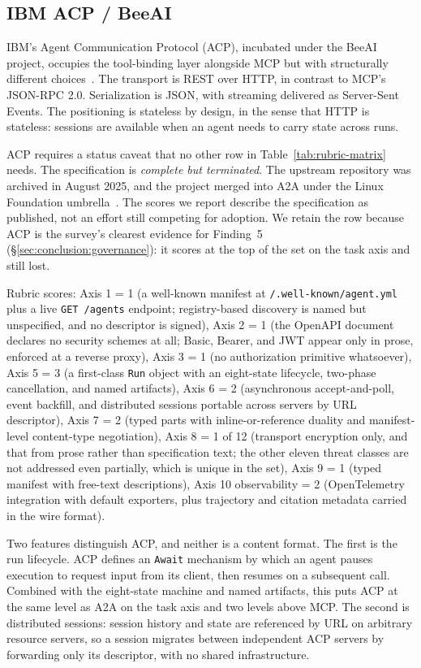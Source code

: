 \subsection{IBM ACP / BeeAI}
\label{sec:industry:acp}

IBM's Agent Communication Protocol (ACP), incubated under
the BeeAI project, occupies the tool-binding layer
alongside MCP but with structurally different
choices~\cite{spec_acp}. The transport is REST over HTTP,
in contrast to MCP's JSON-RPC 2.0. Serialization is JSON,
with streaming delivered as Server-Sent Events. The
positioning is stateless by design, in the sense that HTTP
is stateless: sessions are available when an agent needs
to carry state across runs.

ACP requires a status caveat that no other row in
Table~\ref{tab:rubric-matrix} needs. The specification is
\emph{complete but terminated}. The upstream repository was
archived in August 2025, and the project merged into A2A
under the Linux Foundation umbrella~\cite{spec_acp}. The
scores we report describe the specification as published,
not an effort still competing for adoption. We retain the
row because ACP is the survey's clearest evidence for
Finding~5 (\S\ref{sec:conclusion:governance}): it scores at
the top of the set on the task axis and still lost.

Rubric scores: Axis 1 = 1 (a well-known manifest at
\texttt{/.well-known/agent.yml} plus a live
\texttt{GET /agents} endpoint; registry-based discovery is
named but unspecified, and no descriptor is signed),
Axis 2 = 1 (the OpenAPI document declares no security
schemes at all; Basic, Bearer, and JWT appear only in prose,
enforced at a reverse proxy), Axis 3 = 1 (no authorization
primitive whatsoever), Axis 5 = 3 (a first-class
\texttt{Run} object with an eight-state lifecycle,
two-phase cancellation, and named artifacts), Axis 6 = 2
(asynchronous accept-and-poll, event backfill, and
distributed sessions portable across servers by URL
descriptor), Axis 7 = 2 (typed parts with inline-or-reference
duality and manifest-level content-type negotiation),
Axis 8 = 1 of 12 (transport encryption only, and that from
prose rather than specification text; the other eleven
threat classes are not addressed even partially, which is
unique in the set), Axis 9 = 1 (typed
manifest with free-text descriptions), Axis 10
observability = 2 (OpenTelemetry integration with default
exporters, plus trajectory and citation metadata carried in
the wire format).

Two features distinguish ACP, and neither is a content
format. The first is the run lifecycle. ACP defines an
\texttt{Await} mechanism by which an agent pauses execution
to request input from its client, then resumes on a
subsequent call. Combined with the eight-state machine and
named artifacts, this puts ACP at the same level as A2A on
the task axis and two levels above MCP. The second is
distributed sessions: session history and state are
referenced by URL on arbitrary resource servers, so a
session migrates between independent ACP servers by
forwarding only its descriptor, with no shared
infrastructure.


